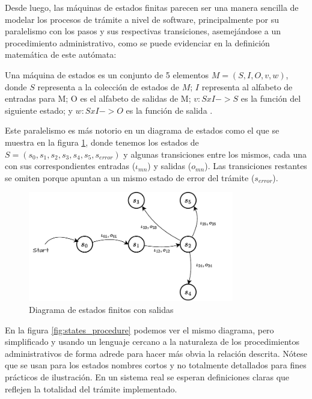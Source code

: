 Desde luego, las máquinas de estados finitas parecen ser una manera sencilla de
modelar los procesos de trámite a nivel de software, principalmente por su
paralelismo con los pasos y sus respectivas transiciones, asemejándose a un
procedimiento administrativo, como se puede evidenciar en la definición
matemática de este autómata:

\begin{definition}
	Una máquina de estados es un conjunto de 5 elementos $M=(S,I,O,v,w)$, donde
	$S$ representa a la colección de estados de $M$; $I$ representa al alfabeto
	de entradas para M; O es el alfabeto de salidas de M; $v:SxI->S$ es la
	función del siguiente estado; y $w:SxI->O$ es la función de salida
	\parencite{grimaldiDiscreteCombinatorialMathematics1998}.
\end{definition}

Este paralelismo es más notorio en un diagrama de estados como el que se muestra
en la figura \ref{fig:states}, donde tenemos los estados de $S = (s_{0}, s_{1},
	s_{2}, s_{3}, s_{4}, s_{5}, s_{error})$ y algunas transiciones entre los mismos,
cada una con sus correspondientes entradas ($\iota_{mn}$) y salidas ($o_{mn}$).
Las transiciones restantes se omiten porque apuntan a un mismo estado de error
del trámite ($s_{error}$).

\begin{figure}[ht]
	\centering
	\includegraphics[width=0.8\textwidth]{assets/statediagramexample}
	\caption{Diagrama de estados finitos con salidas}
	\label{fig:states}
\end{figure}

En la figura \ref{fig:states_procedure} podemos ver el mismo diagrama, pero
simplificado y usando un lenguaje cercano a la naturaleza de los procedimientos
administrativos de forma adrede para hacer más obvia la relación descrita.
Nótese que se usan para los estados nombres cortos y no totalmente detallados
para fines prácticos de ilustración. En un sistema real se esperan definiciones
claras que reflejen la totalidad del trámite implementado.


